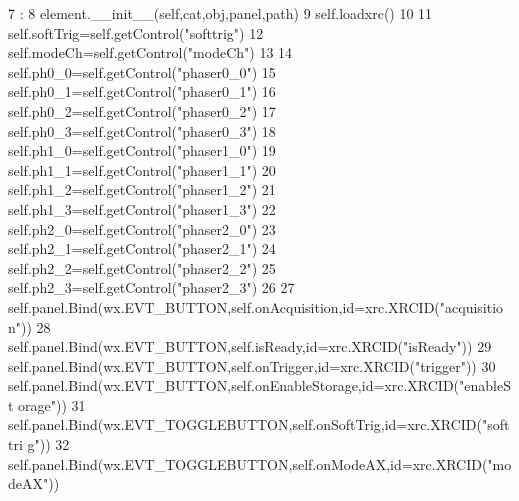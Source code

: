 \begin{DoxyCode}
7                                              :
8         element.__init__(self,cat,obj,panel,path)
9         self.loadxrc()
10 
11         self.softTrig=self.getControl("softtrig")
12         self.modeCh=self.getControl("modeCh")
13 
14         self.ph0_0=self.getControl("phaser0_0")
15         self.ph0_1=self.getControl("phaser0_1")
16         self.ph0_2=self.getControl("phaser0_2")
17         self.ph0_3=self.getControl("phaser0_3")
18         self.ph1_0=self.getControl("phaser1_0")
19         self.ph1_1=self.getControl("phaser1_1")
20         self.ph1_2=self.getControl("phaser1_2")
21         self.ph1_3=self.getControl("phaser1_3")
22         self.ph2_0=self.getControl("phaser2_0")
23         self.ph2_1=self.getControl("phaser2_1")
24         self.ph2_2=self.getControl("phaser2_2")
25         self.ph2_3=self.getControl("phaser2_3")
26 
27         self.panel.Bind(wx.EVT_BUTTON,self.onAcquisition,id=xrc.XRCID("acquisitio
      n"))
28         self.panel.Bind(wx.EVT_BUTTON,self.isReady,id=xrc.XRCID("isReady"))
29         self.panel.Bind(wx.EVT_BUTTON,self.onTrigger,id=xrc.XRCID("trigger"))
30         self.panel.Bind(wx.EVT_BUTTON,self.onEnableStorage,id=xrc.XRCID("enableSt
      orage"))
31         self.panel.Bind(wx.EVT_TOGGLEBUTTON,self.onSoftTrig,id=xrc.XRCID("softtri
      g"))
32         self.panel.Bind(wx.EVT_TOGGLEBUTTON,self.onModeAX,id=xrc.XRCID("modeAX"))
      

\end{DoxyCode}
